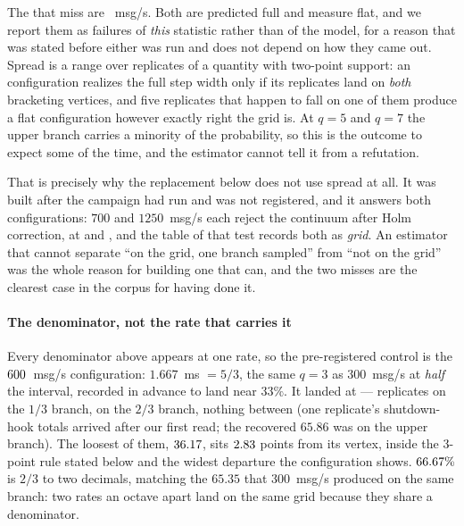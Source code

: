 \documentclass[10pt,journal,onecolumn]{IEEEtran}
\begin{document}
The \spreadMissWord{} that miss are \spreadMissRates{}~msg/s. Both are predicted full and
measure flat, and we report them as failures of \emph{this} statistic rather than of the
model, for a reason that was stated before either was run and does not depend on how they came
out. Spread is a range over replicates of a quantity with two-point support: an configuration realizes
the full step width only if its replicates land on \emph{both} bracketing vertices, and five
replicates that happen to fall on one of them produce a flat configuration however exactly right the
grid is. At $q=5$ and $q=7$ the upper branch carries a minority of the probability, so this is
the outcome to expect some of the time, and the estimator cannot tell it from a refutation.

That is precisely why the replacement below does not use spread at all. It was built after the
campaign had run and was not registered, and it answers both configurations: $700$ and $1250$~msg/s each reject the continuum after Holm
correction, at \pgridSevenHundred{} and \pgridTwelveFifty{}, and the table of that test
records both as \emph{grid}. An estimator that cannot separate ``on the grid, one branch
sampled'' from ``not on the grid'' was the whole reason for building one that can, and the two
misses are the clearest case in the corpus for having done it.

\paragraph{The denominator, not the rate that carries it} Every denominator above
appears at one rate, so the pre-registered control is the $600$~msg/s configuration: $1.667$~ms
$= 5/3$, the same $q=3$ as $300$~msg/s at \emph{half} the interval, recorded in advance to
land near $33\%$. It landed at \armSixHundredReplicates{} --- \armSixHundredLowerWord{}
replicates on the $1/3$ branch, \armSixHundredUpperWord{} on the $2/3$ branch, nothing between (one
replicate's shutdown-hook totals arrived after our first read; the recovered $65.86$ was on the
upper branch). The loosest of them, $36.17$, sits $2.83$ points from its
vertex, inside the $3$-point rule stated below and the widest departure the configuration shows.
$66.67\%$ is $2/3$ to two decimals, matching the $65.35$ that $300$~msg/s produced
on the same branch: two rates an octave apart land on the same grid because they share a
denominator.
\end{document}
